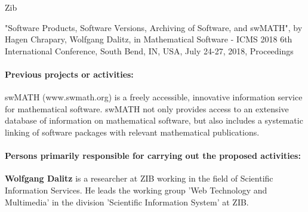 \begin{sitedescription}{Zib}
\begin{compactitem}
\item  "Software Products, Software Versions, Archiving of Software, and swMATH",
by Hagen Chrapary, Wolfgang Dalitz, 
in Mathematical Software - ICMS 2018
6th International Conference, South Bend, IN, USA, July 24-27, 2018, Proceedings 

\end{compactitem}

\paragraph*{Previous projects or activities:}


\begin{compactitem}
\item swMATH (www.swmath.org) is a freely accessible, innovative information service for mathematical software. 
swMATH not only provides access to an extensive database of information on mathematical software, 
but also includes a systematic linking of software packages with relevant mathematical publications.
\end{compactitem}



\paragraph*{Persons primarily responsible for carrying out the proposed activities:}

\begin{compactitem} %

\item{\bf Wolfgang Dalitz} is a  researcher at ZIB working in the field of Scientific Information Services. 
He leads the working group 'Web Technology and Multimedia' in the division 'Scientific Information System' at ZIB.


\end{compactitem}

\end{sitedescription}

